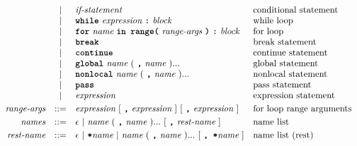 \[\begin{array}{rcll}
                            & |   & \textit{if-statement}                                                                    & \text{conditional statement}            \\
                            & |   & \term{while}\ \textit{expression}\ \term{:}\ \textit{block}                              & \text{while loop}                       \\
                            & |   & \term{for}\ \textit{name}\ \term{in\ range(}
                                    \ \textit{range-args}\ \term{)}\ \term{:}\ \textit{block}                                & \text{for loop}                         \\
                            & |   & \term{break}                                                                             & \text{break statement}                  \\
                            & |   & \term{continue}                                                                          & \text{continue statement}               \\
                            & |   & \term{global}\ \textit{name}\ (\ \term{,}\ \textit{name}\ )...                           & \text{global statement}                   \\
                            & |   & \term{nonlocal}\ \textit{name}\ (\ \term{,}\ \textit{name}\ )...                         & \text{nonlocal statement}               \\
                            & |   & \term{pass}                                                                              & \text{pass statement}               \\
                            & |   & \textit{expression}                                                                      & \text{expression statement}             \\[1mm]
\textit{range-args}         & ::= & \textit{expression}\ [\ \term{,}\ \textit{expression}\ ]
                                    \ [\ \term{,}\ \textit{expression}\ ]                                                    & \text{for loop range arguments}         \\[1mm]
\textit{names}              & ::= & \epsilon\ |\ \textit{name}\ (\ \term{,}\ \textit{name}\ )...\ [\ \term{,}\ \textit{rest-name}\ ]   & \text{name list}                        \\[1mm]
\textit{rest-name}          & ::= & \epsilon\ |\ \term{*}\textit{name}
                                    \ |\ \textit{name}\ (\ \term{,}\ \textit{name}\ )...\ [\ \term{,\ *}\textit{name}\ ]     & \text{name list (rest)}                 \\[1mm]

\end{array}\]
